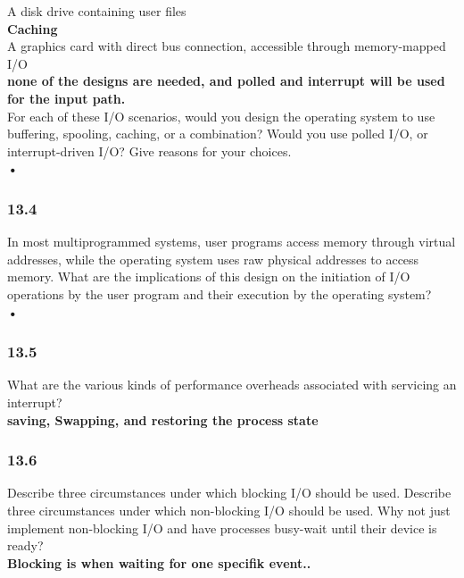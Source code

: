\documentclass[a4paper,10pt,titlepage]{report}
\begin{document}
\hspace{10mm} 	A disk drive containing user files \\
\hspace{15mm} \textbf{Caching  } \\

\hspace{10mm} 	A graphics card with direct bus connection, accessible through memory-mapped I/O \\
\hspace{15mm} \textbf{ none of the designs are needed, and polled and interrupt will be used for the input path.} \\

\hspace{10mm} 	For each of these I/O scenarios, would you design the operating system to use buffering, spooling, caching, or a combination? Would you use polled I/O, or interrupt-driven I/O? Give reasons for your choices. \\
\hspace{15mm} \textbf{•} \\



\subsubsection{13.4} In most multiprogrammed systems, user programs access memory through virtual addresses, while the operating system uses raw physical addresses to access memory. What are the implications of this design on the initiation of I/O operations by the user program and their execution by the operating system? \\
\hspace{15mm} \textbf{ • } \\



\subsubsection{13.5} What are the various kinds of performance overheads associated with servicing an interrupt?\\
\hspace{15mm} \textbf{ saving, Swapping, and restoring the process state } \\



\subsubsection{13.6} Describe three circumstances under which blocking I/O should be used. Describe three circumstances under which non-blocking I/O should be used. Why not just implement non-blocking I/O and have processes busy-wait until their device is ready?\\
\hspace{15mm} \textbf{ Blocking is when waiting for one specifik event..} \\
\end{document}
